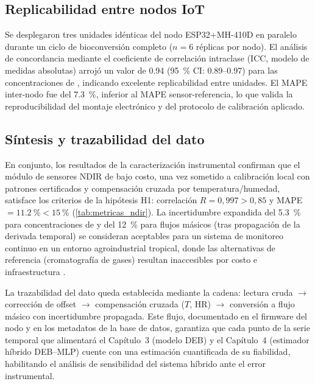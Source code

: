 \subsection{Replicabilidad entre nodos IoT}
\label{subsec:cap2_resultados_replicabilidad}

Se desplegaron tres unidades idénticas del nodo ESP32+MH-410D en paralelo durante un ciclo de bioconversión completo ($n = 6$ réplicas por nodo). El análisis de concordancia mediante el coeficiente de correlación intraclase (ICC, modelo de medidas absolutas) arrojó un valor de \num{0.94} (\SI{95}{\percent} CI: \num{0.89}--\num{0.97}) para las concentraciones de , indicando excelente replicabilidad entre unidades. El MAPE inter-nodo fue del \SI{7.3}{\percent}, inferior al MAPE sensor-referencia, lo que valida la reproducibilidad del montaje electrónico y del protocolo de calibración aplicado.

\subsection{Síntesis y trazabilidad del dato}
\label{subsec:cap2_resultados_sintesis}

En conjunto, los resultados de la caracterización instrumental confirman que el módulo de sensores NDIR de bajo costo, una vez sometido a calibración local con patrones certificados y compensación cruzada por temperatura/humedad, satisface los criterios de la hipótesis H1: correlación $R = 0{,}997 > 0{,}85$ y MAPE $= \SI{11.2}{\percent} < \SI{15}{\percent}$ (\cref{tab:metricas_ndir}). La incertidumbre expandida del \SI{5.3}{\percent} para concentraciones de  y del \SI{12}{\percent} para flujos másicos (tras propagación de la derivada temporal) se consideran aceptables para un sistema de monitoreo continuo en un entorno agroindustrial tropical, donde las alternativas de referencia (cromatografía de gases) resultan inaccesibles por costo e infraestructura \parencite{biagiDevelopmentMachineLearningbased2024a, rajRealTimeEstimation2023a}.

La trazabilidad del dato queda establecida mediante la cadena: lectura cruda $\rightarrow$ corrección de offset $\rightarrow$ compensación cruzada ($T$, HR) $\rightarrow$ conversión a flujo másico con incertidumbre propagada. Este flujo, documentado en el firmware del nodo y en los metadatos de la base de datos, garantiza que cada punto de la serie temporal que alimentará el Capítulo~3 (modelo DEB) y el Capítulo~4 (estimador híbrido DEB--MLP) cuente con una estimación cuantificada de su fiabilidad, habilitando el análisis de sensibilidad del sistema híbrido ante el error instrumental.
